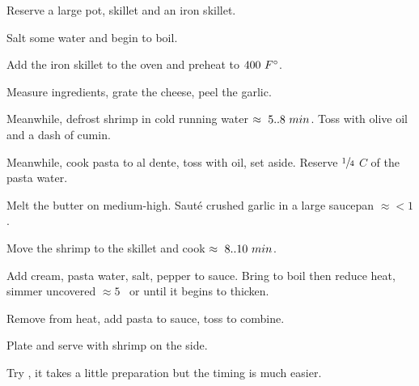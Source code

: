 \begin{preparation}
\item Reserve a large pot, skillet and an iron skillet.

\item Salt some water and begin to boil.

\item Add the iron skillet to the oven and preheat to $400~\Fahrenheit$.

\item Measure ingredients, grate the cheese, peel the garlic.

\item Meanwhile, defrost shrimp in cold running water $\approx~5..8~\minute$.
    Toss with olive oil and a dash of cumin.

\item Meanwhile, cook pasta to al dente, toss with oil, set aside.
    Reserve $\onefourth$ $C$ of the pasta water.

\item Melt the butter on medium-high.
    Saut\'{e} crushed garlic in a large saucepan $\approx<1$ \minute.

\item Move the shrimp to the skillet and cook $\approx~8..10~\minute$.

\item Add cream, pasta water, salt, pepper to sauce.
    Bring to boil then reduce heat, simmer uncovered $\approx5$ \minute~or until it begins to thicken.

\item Remove from heat, add pasta to sauce, toss to combine.

\item Plate and serve with shrimp on the side.
\end{preparation}

\begin{variation}
\item Try , it takes a little preparation but the timing is much easier.

\end{variation}

\recipeend%
